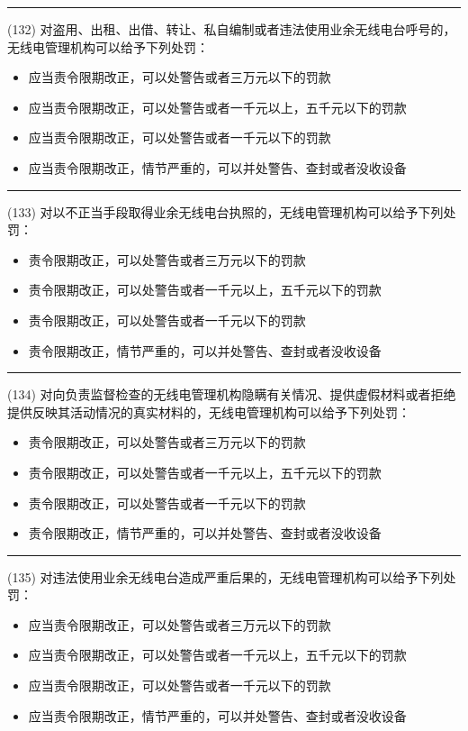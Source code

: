 \documentclass[twocolumn,hyperref,UTF8]{ctexart}  %
\begin{document}
\noindent\rule{0.5\textwidth}{1pt}
\heiti (132) 对盗用、出租、出借、转让、私自编制或者违法使用业余无线电台呼号的，无线电管理机构可以给予下列处罚： \songti {\color{gray} [LK0099] }
\begin{itemize}
	\item  应当责令限期改正，可以处警告或者三万元以下的罚款
	\item  应当责令限期改正，可以处警告或者一千元以上，五千元以下的罚款
	\item  应当责令限期改正，可以处警告或者一千元以下的罚款
	\item  应当责令限期改正，情节严重的，可以并处警告、查封或者没收设备
\end{itemize}


\noindent\rule{0.5\textwidth}{1pt}
\heiti (133) 对以不正当手段取得业余无线电台执照的，无线电管理机构可以给予下列处罚： \songti {\color{gray} [LK0100] }
\begin{itemize}
	\item  责令限期改正，可以处警告或者三万元以下的罚款
	\item  责令限期改正，可以处警告或者一千元以上，五千元以下的罚款
	\item  责令限期改正，可以处警告或者一千元以下的罚款
	\item  责令限期改正，情节严重的，可以并处警告、查封或者没收设备
\end{itemize}


\noindent\rule{0.5\textwidth}{1pt}
\heiti (134) 对向负责监督检查的无线电管理机构隐瞒有关情况、提供虚假材料或者拒绝提供反映其活动情况的真实材料的，无线电管理机构可以给予下列处罚： \songti {\color{gray} [LK0101] }
\begin{itemize}
	\item  责令限期改正，可以处警告或者三万元以下的罚款
	\item  责令限期改正，可以处警告或者一千元以上，五千元以下的罚款
	\item  责令限期改正，可以处警告或者一千元以下的罚款
	\item  责令限期改正，情节严重的，可以并处警告、查封或者没收设备
\end{itemize}


\noindent\rule{0.5\textwidth}{1pt}
\heiti (135) 对违法使用业余无线电台造成严重后果的，无线电管理机构可以给予下列处罚： \songti {\color{gray} [LK0102] }
\begin{itemize}
	\item  应当责令限期改正，可以处警告或者三万元以下的罚款
	\item  应当责令限期改正，可以处警告或者一千元以上，五千元以下的罚款
	\item  应当责令限期改正，可以处警告或者一千元以下的罚款
	\item  应当责令限期改正，情节严重的，可以并处警告、查封或者没收设备
\end{itemize}
\end{document}
